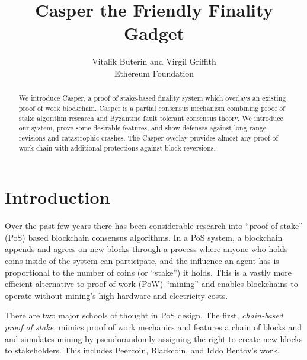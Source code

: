 \documentclass[12pt]{article}
\title{Casper the Friendly Finality Gadget}
\author{
        Vitalik Buterin \textnormal{ and } Virgil Griffith \\        
        Ethereum Foundation}
\begin{document}
\maketitle


\begin{abstract}
We introduce Casper, a proof of stake-based finality system which overlays an existing proof of work blockchain. Casper is a partial consensus mechanism combining proof of stake algorithm research and Byzantine fault tolerant consensus theory.  We introduce our system, prove some desirable features, and show defenses against long range revisions and catastrophic crashes.  The Casper overlay provides almost any proof of work chain with additional protections against block reversions.
\end{abstract}

\section{Introduction}
\label{sect:intro}

Over the past few years there has been considerable research into ``proof of stake'' (PoS) based blockchain consensus algorithms. In a PoS system, a blockchain appends and agrees on new blocks through a process where anyone who holds coins inside of the system can participate, and the influence an agent has is proportional to the number of coins (or ``stake'') it holds. This is a vastly more efficient alternative to proof of work (PoW) ``mining'' and enables blockchains to operate without mining's high hardware and electricity costs.

There are two major schools of thought in PoS design. The first, \textit{chain-based proof of stake}\cite{shi2017,dfinity}, mimics proof of work mechanics and features a chain of blocks and and simulates mining by pseudorandomly assigning the right to create new blocks to stakeholders.  This includes Peercoin\cite{king2012ppcoin}, Blackcoin\cite{vasin2014blackcoin}, and Iddo Bentov's work\cite{bentov2016pos}.
\end{document}
